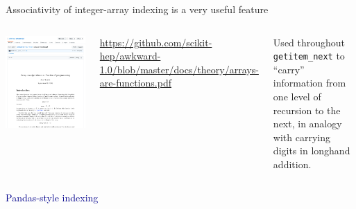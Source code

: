 \documentclass[aspectratio=169]{beamer}
\begin{document}
\begin{frame}{Associativity of integer-array indexing is a very useful feature}
\vspace{0.2 cm}
\begin{columns}
\includegraphics[width=\linewidth]{arrays-as-functions-paper.png}

\small
\textcolor{blue}{\url{https://github.com/scikit-hep/awkward-1.0/blob/master/docs/theory/arrays-are-functions.pdf}}

\large
\vspace{1 cm}
Used throughout \texttt{getitem_next} to ``carry'' information from one level of recursion to the next, in analogy with carrying digits in longhand addition.
\end{columns}
\end{frame}

\begin{frame}{}
\huge
\vspace{1 cm}
\begin{center}
\textcolor{darkblue}{Pandas-style indexing}
\end{center}
\end{frame}
\end{document}
